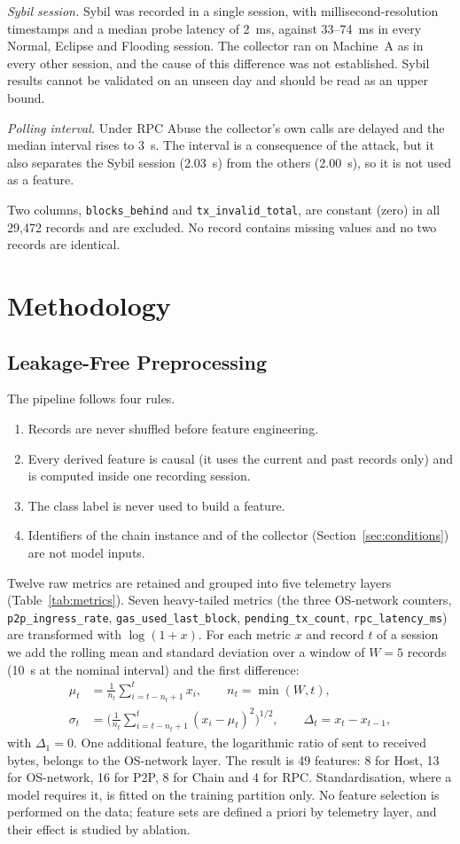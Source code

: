 \documentclass[journal]{IEEEtran}
\newcommand{\code}[1]{\texttt{\small #1}}
\begin{document}
\emph{Sybil session.} Sybil was recorded in a single session, with millisecond-resolution timestamps and a median probe latency of 2~ms, against 33--74~ms in every Normal, Eclipse and Flooding session. The collector ran on Machine~A as in every other session, and the cause of this difference was not established. Sybil results cannot be validated on an unseen day and should be read as an upper bound.

\emph{Polling interval.} Under RPC Abuse the collector's own calls are delayed and the median interval rises to 3~s. The interval is a consequence of the attack, but it also separates the Sybil session (2.03~s) from the others (2.00~s), so it is not used as a feature.

Two columns, \code{blocks\_behind} and \code{tx\_invalid\_total}, are constant (zero) in all 29{,}472 records and are excluded. No record contains missing values and no two records are identical.

\section{Methodology}\label{sec:method}
\subsection{Leakage-Free Preprocessing}\label{sec:preproc}
The pipeline follows four rules.
\begin{enumerate}
\item Records are never shuffled before feature engineering.
\item Every derived feature is causal (it uses the current and past records only) and is computed inside one recording session.
\item The class label is never used to build a feature.
\item Identifiers of the chain instance and of the collector (Section~\ref{sec:conditions}) are not model inputs.
\end{enumerate}
Twelve raw metrics are retained and grouped into five telemetry layers (Table~\ref{tab:metrics}). Seven heavy-tailed metrics (the three OS-network counters, \code{p2p\_ingress\_rate}, \code{gas\_used\_last\_block}, \code{pending\_tx\_count}, \code{rpc\_latency\_ms}) are transformed with $\log(1+x)$. For each metric $x$ and record $t$ of a session we add the rolling mean and standard deviation over a window of $W=5$ records (10~s at the nominal interval) and the first difference:
\begin{align}
\mu_t &= \tfrac{1}{n_t}\textstyle\sum_{i=t-n_t+1}^{t} x_i, \qquad n_t=\min(W,t),\\
\sigma_t &= \bigl(\tfrac{1}{n_t}\textstyle\sum_{i=t-n_t+1}^{t}(x_i-\mu_t)^2\bigr)^{1/2},\qquad \Delta_t = x_t-x_{t-1},
\end{align}
with $\Delta_1=0$. One additional feature, the logarithmic ratio of sent to received bytes, belongs to the OS-network layer. The result is 49 features: 8 for Host, 13 for OS-network, 16 for P2P, 8 for Chain and 4 for RPC. Standardisation, where a model requires it, is fitted on the training partition only. No feature selection is performed on the data; feature sets are defined a priori by telemetry layer, and their effect is studied by ablation.
\end{document}
